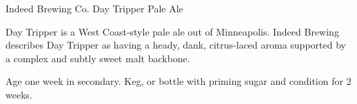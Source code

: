 \begin{recipie}{Indeed Brewing Co. Day Tripper Pale Ale}

\begin{aboutblock}
Day Tripper is a West Coast-style pale ale out of Minneapolis. Indeed Brewing
describes Day Tripper as having a heady, dank, citrus-laced aroma supported by a
complex and subtly sweet malt backbone.
\end{aboutblock}


\begin{methodandtiming}
 
\begin{mashsteps}
\end{mashsteps}

\begin{fermentationsteps}
\end{fermentationsteps}

\begin{directions}
Age one week in secondary. Keg, or bottle with  priming sugar and condition
for 2 weeks.
\end{directions}

\end{methodandtiming}

\pagebreak

\begin{ingredientsblock}

\begin{malts}

\end{malts}

\begin{hops}

\end{hops}

\begin{yeasts}
\end{yeasts}

\end{ingredientsblock}

\end{recipie}


